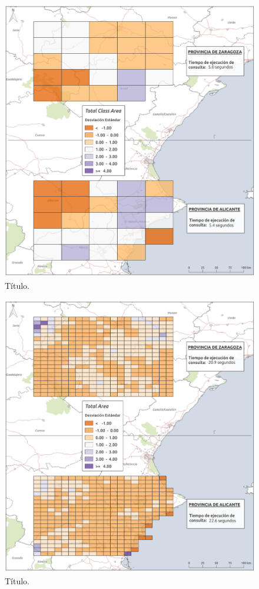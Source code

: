 \begin{figure}
\begin{center}
\includegraphics[width=\textwidth]{ResultadosyDiscusion/Figs/Results/c_100.png}
\caption{Título.}
\end{center}
\end{figure}

\begin{figure}
\begin{center}
\includegraphics[width=\textwidth]{ResultadosyDiscusion/Figs/Results/l_25.png}
\caption{Título.}
\end{center}
\end{figure}

